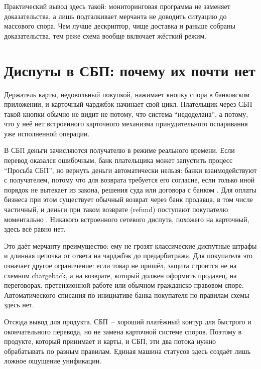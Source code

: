 Практический вывод здесь такой: мониторинговая программа не заменяет
доказательства, а лишь подталкивает мерчанта не доводить ситуацию до
массового спора. Чем лучше дескриптор, чище доставка и раньше собраны
доказательства, тем реже схема вообще включает жёсткий режим.

\section{Диспуты в СБП: почему их почти нет}
\label{sec:disputes-sbp}

Держатель карты, недовольный покупкой, нажимает кнопку спора в
банковском приложении, и карточный чарджбэк начинает свой цикл.
Плательщик через СБП такой кнопки обычно не видит не потому,
что система \enquote{недоделана}, а потому, что у неё нет встроенного
карточного механизма принудительного оспаривания уже исполненной
операции.

В СБП деньги зачисляются получателю в режиме реального времени. Если
перевод оказался ошибочным, банк плательщика может запустить процесс
\enquote{Просьба СБП}, но вернуть деньги автоматически нельзя: банки
взаимодействуют с получателем, потому что для возврата требуется его
согласие, если только иной порядок не вытекает из закона, решения суда
или договора с банком \cite{cbr-sbp-faq-mistaken-transfer}.
Для оплаты бизнеса при этом существует обычный возврат через банк
продавца, в том числе частичный, и деньги при таком возврате
(refund) поступают
покупателю моментально \cite{sbp-faq-business}. Никакого встроенного
сетевого диспута, похожего на карточный, здесь всё равно нет.

Это даёт мерчанту преимущество: ему не грозят классические диспутные
штрафы и длинная цепочка от ответа на чарджбэк до предарбитража.
Для покупателя это означает другое ограничение: если товар не пришёл,
защита строится не на схемном chargeback, а на возврате, который должен
оформить продавец, на переговорах, претензионной работе или обычном
гражданско-правовом споре. Автоматического списания по инициативе банка
покупателя по правилам схемы здесь нет.

Отсюда вывод для продукта. СБП~-- хороший платёжный контур
для быстрого и окончательного перевода, но не замена карточной системе
споров. Поэтому в продукте, который принимает и карты, и СБП, эти два
потока нужно обрабатывать по разным правилам. Единая машина статусов
здесь создаёт лишь ложное ощущение унификации.

